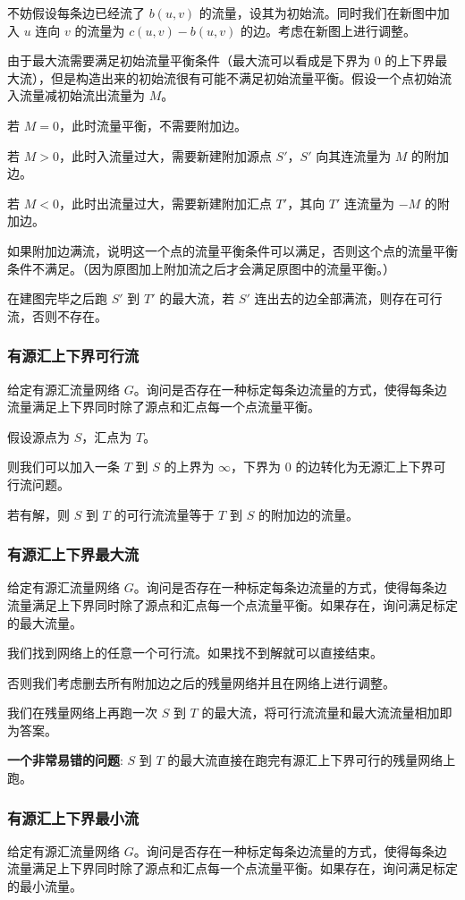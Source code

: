 \documentclass{article}
\begin{document}
不妨假设每条边已经流了 $b(u,v)$ 的流量，设其为初始流。同时我们在新图中加入 $u$ 连向 $v$ 的流量为 $c(u,v) - b(u,v)$ 的边。考虑在新图上进行调整。

由于最大流需要满足初始流量平衡条件（最大流可以看成是下界为 $0$ 的上下界最大流），但是构造出来的初始流很有可能不满足初始流量平衡。假设一个点初始流入流量减初始流出流量为 $M$。

若 $M=0$，此时流量平衡，不需要附加边。

若 $M>0$，此时入流量过大，需要新建附加源点 $S'$，$S'$ 向其连流量为 $M$ 的附加边。

若 $M<0$，此时出流量过大，需要新建附加汇点 $T'$，其向 $T'$ 连流量为 $-M$ 的附加边。

如果附加边满流，说明这一个点的流量平衡条件可以满足，否则这个点的流量平衡条件不满足。（因为原图加上附加流之后才会满足原图中的流量平衡。）

在建图完毕之后跑 $S'$ 到 $T'$ 的最大流，若 $S'$ 连出去的边全部满流，则存在可行流，否则不存在。
\subsubsection{有源汇上下界可行流}
给定有源汇流量网络 $G$。询问是否存在一种标定每条边流量的方式，使得每条边流量满足上下界同时除了源点和汇点每一个点流量平衡。

假设源点为 $S$，汇点为 $T$。

则我们可以加入一条 $T$ 到 $S$ 的上界为 $\infty$，下界为 $0$ 的边转化为无源汇上下界可行流问题。

若有解，则 $S$ 到 $T$ 的可行流流量等于 $T$ 到 $S$ 的附加边的流量。
\subsubsection{有源汇上下界最大流}
给定有源汇流量网络 $G$。询问是否存在一种标定每条边流量的方式，使得每条边流量满足上下界同时除了源点和汇点每一个点流量平衡。如果存在，询问满足标定的最大流量。

我们找到网络上的任意一个可行流。如果找不到解就可以直接结束。

否则我们考虑删去所有附加边之后的残量网络并且在网络上进行调整。

我们在残量网络上再跑一次 $S$ 到 $T$ 的最大流，将可行流流量和最大流流量相加即为答案。

\textbf{一个非常易错的问题}: $S$ 到 $T$ 的最大流直接在跑完有源汇上下界可行的残量网络上跑。
\subsubsection{有源汇上下界最小流}
给定有源汇流量网络 $G$。询问是否存在一种标定每条边流量的方式，使得每条边流量满足上下界同时除了源点和汇点每一个点流量平衡。如果存在，询问满足标定的最小流量。
\end{document}
